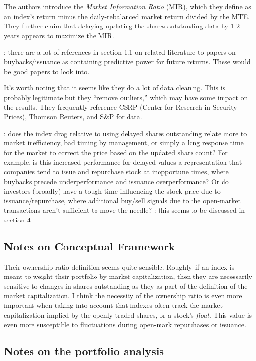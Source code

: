 \documentclass{article}
\begin{document}
The authors introduce the {\it Market Information Ratio} (MIR), which they define as an index's return minus the daily-rebalanced market return divided by the MTE.  They further claim that delaying updating the shares outstanding data by 1-2 years appears to maximize the MIR.

: there are a lot of references in section 1.1 on related literature to papers on buybacks/issuance as containing predictive power for future returns.  These would be good papers to look into.

It's worth noting that it seems like they do a lot of data cleaning.  This is probably legitimate but they ``remove outliers,'' which may have some impact on the results.  They frequently reference CSRP (Center for Research in Security Prices), Thomson Reuters, and S\&P for data.

: does the index drag relative to using delayed shares outstanding relate more to market inefficiency, bad timing by management, or simply a long response time for the market to correct the price based on the updated share count?  For example, is this increased performance for delayed values a representation that companies tend to issue and repurchase stock at inopportune times, where buybacks precede underperformance and issuance overperformance?  Or do investors (broadly) have a tough time influencing the stock price due to issuance/repurchase, where additional buy/sell signals due to the open-market transactions aren't sufficient to move the needle?  \note{[Note]}: this seems to be discussed in section 4.

\subsection{Notes on Conceptual Framework}

Their ownership ratio definition seems quite sensible.  Roughly, if an index is meant to weight their portfolio by market capitalization, then they are necessarily sensitive to changes in shares outstanding as they as part of the definition of the market capitalization.  I think the necessity of the ownership ratio is even more important when taking into account that indexes often track the market capitalization implied by the openly-traded shares, or a stock's {\it float}.  This value is even more susceptible to fluctuations during open-mark repurchases or issuance.

\subsection{Notes on the portfolio analysis}
\end{document}
